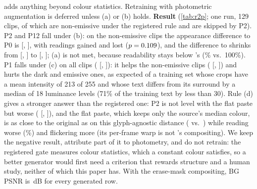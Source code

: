 adds anything beyond colour statistics. Retraining with photometric augmentation is deferred unless (a) or (b) holds. \textbf{Result} (\cref{tab:r2p}; one run, 129 clips, of which \rpNonem{} are non-emissive under the registered rule and \rpEmis{} are skipped by P2). P2 and P12 fall under (b): on the non-emissive clips the appearance difference to P0 is \rpPTwoNeMean{} [\rpPTwoNeLo, \rpPTwoNeHi], with \rpPTwoNeWins{} readings gained and \rpPTwoNeLosses{} lost ($p=0.109$), and the difference to \method shrinks from \rpPZeroNeVsBMean{} [\rpPZeroNeVsBLo, \rpPZeroNeVsBHi] to \rpPTwoNeVsBMean{} [\rpPTwoNeVsBLo, \rpPTwoNeVsBHi]; (a) is not met, because readability stays below \method's (\rpPTwoNeRead\% vs.\ 100\%). P1 falls under (c) on all clips (\rpPOneAllMean{} [\rpPOneAllLo, \rpPOneAllHi]): it helps the non-emissive clips (\rpPOneNeMean{} [\rpPOneNeLo, \rpPOneNeHi]) and hurts the dark and emissive ones, as expected of a training set whose crops have a mean intensity of 213 of 255 and whose text differs from its surround by a median of 18 luminance levels (71\% of the training text by less than 30). Rule (d) gives a stronger answer than the registered one: P2 is not level with the flat paste but worse (\rpPTwoNeVsFlatMean{} [\rpPTwoNeVsFlatLo, \rpPTwoNeVsFlatHi]), and the flat paste, which keeps only the source's median colour, is as close to the original as \method on this glyph-agnostic distance (\rpFlatAllMad{} vs.\ \rpBoneAllMad) while reading worse (\rpFlatAllRead\%) and flickering more (its per-frame warp is not \method's compositing). We keep the negative result, attribute part of it to photometry, and do not retrain: the registered gate measures colour statistics, which a constant colour satisfies, so a better generator would first need a criterion that rewards structure and a human study, neither of which this paper has. With the erase-mask compositing, BG PSNR is \rpPZeroAllBG\,dB for every generated row.

